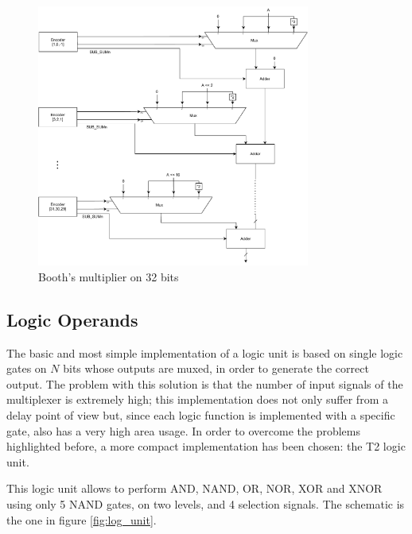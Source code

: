 \begin{figure}[ht]
    \centering
    \includegraphics[width=0.8\textwidth]{chapters/5_ExecuteStage/images/multiplier.pdf}
    \caption{Booth's multiplier on 32 bits}
    \label{fig:multiplier}
\end{figure}

    
\subsection{Logic Operands}
The basic and most simple implementation of a logic unit is based on single logic gates on $N$ bits whose outputs are muxed, in order to generate the correct output. The problem with this solution is that the number of input signals of the multiplexer is extremely high; this implementation does not only suffer from a delay point of view but, since each logic function is implemented with a specific gate, also has a very high area usage.\newline\newline
In order to overcome the problems highlighted before, a more compact implementation has been chosen: the T2 logic unit.

This logic unit allows to perform AND, NAND, OR, NOR, XOR and XNOR using only 5 NAND gates, on two levels, and 4 selection signals. The schematic is the one in figure \ref{fig:log_unit}.

